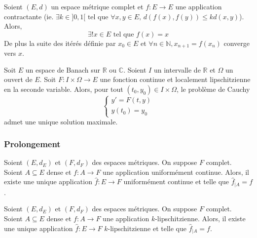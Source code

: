 
  \begin{theorem}
    Soient $(E,d)$ un espace métrique complet et $f : E \rightarrow E$ une application contractante (ie. $\exists k \in ]0,1[ \text{ tel que } \forall x, y \in E, \, d(f(x), f(y)) \leq k d(x, y)$). Alors,
    \[ \exists! x \in E \text{ tel que } f(x) = x \]
    De plus la suite des itérés définie par $x_0 \in E$ et $\forall n \in \mathbb{N}, x_{n+1} = f(x_n)$ converge vers $x$.
  \end{theorem}


  \begin{application}
    Soit $E$ un espace de Banach sur $\mathbb{R}$ ou $\mathbb{C}$. Soient $I$ un intervalle de $\mathbb{R}$ et $\Omega$ un ouvert de $E$. Soit $F : I \times \Omega \rightarrow E$ une fonction continue et localement lipschitzienne en la seconde variable. Alors, pour tout $(t_0, y_0) \in I \times \Omega$, le problème de Cauchy
    \[ \begin{cases} y'=F(t,y) \\ y(t_0) = y_0 \end{cases} \tag{$C$} \]
    admet une unique solution maximale.
  \end{application}

  \subsubsection{Prolongement}


  \begin{theorem}
    Soient $(E,d_E)$ et $(F,d_F)$ des espaces métriques. On suppose $F$ complet. Soient $A \subseteq E$ dense et $f : A \rightarrow F$ une application uniformément continue. Alors, il existe une unique application $\widehat{f} : E \rightarrow F$ uniformément continue et telle que $\widehat{f}_{|A} = f$.
  \end{theorem}

  \begin{corollary}
    Soient $(E,d_E)$ et $(F,d_F)$ des espaces métriques. On suppose $F$ complet. Soient $A \subseteq E$ dense et $f : A \rightarrow F$ une application $k$-lipschitzienne. Alors, il existe une unique application $\widehat{f} : E \rightarrow F$ $k$-lipschitzienne et telle que $\widehat{f}_{|A} = f$.
  \end{corollary}

